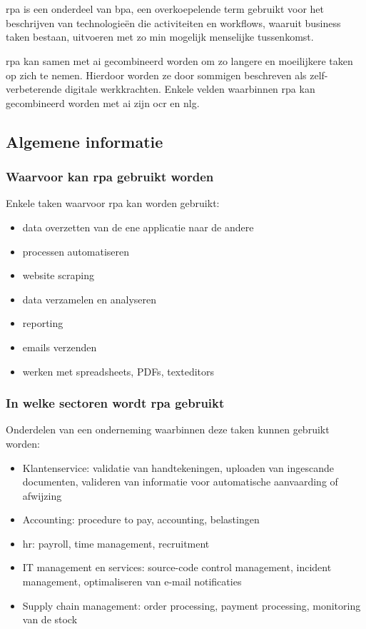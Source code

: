 \chapter{}
\label{ch:stand-van-zaken}

\acrshort{rpa} is een onderdeel van \acrfull{bpa}, een overkoepelende term gebruikt voor het beschrijven van technologieën die \gls{activiteit}en en \gls{workflow}s, waaruit business taken bestaan, uitvoeren met zo min mogelijk menselijke tussenkomst. \autocite{everythingRPA}

\acrshort{rpa} kan samen met \acrfull{ai} gecombineerd worden om zo langere en moeilijkere taken op zich te nemen. Hierdoor worden ze door sommigen beschreven als zelf-verbeterende digitale werkkrachten. Enkele velden waarbinnen \acrshort{rpa} kan gecombineerd worden met \acrshort{ai} zijn \acrfull{ocr} en \acrfull{nlg}. \autocite{everythingRPA}

\section{Algemene informatie}

\subsection{Waarvoor kan \acrshort{rpa} gebruikt worden}
Enkele taken waarvoor \acrshort{rpa} kan worden gebruikt:
\begin{itemize}
	\item data overzetten van de ene applicatie naar de andere
	\item processen automatiseren
	\item website scraping
	\item data verzamelen en analyseren
	\item reporting
	\item emails verzenden
	\item werken met spreadsheets, PDFs, texteditors
\end{itemize}
\autocite{everythingRPA} \autocite{idrRPA}

\subsection{In welke sectoren wordt \acrshort{rpa} gebruikt}
Onderdelen van een onderneming waarbinnen deze taken kunnen gebruikt worden:
\begin{itemize}
	\item Klantenservice: validatie van handtekeningen, uploaden van ingescande documenten, valideren van informatie voor automatische aanvaarding of afwijzing
	\item Accounting: procedure to pay, accounting, belastingen
	\item \acrfull{hr}: payroll, time management, recruitment
	\item IT management en services: source-code control management, incident management, optimaliseren van e-mail notificaties
	\item Supply chain management: order processing, payment processing, monitoring van de stock
\end{itemize}
\autocite{everythingRPA}

